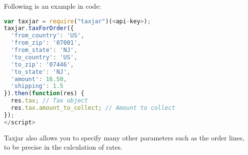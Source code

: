 Following is an example in code:
\begin{lstlisting}[language=javascript]
var taxjar = require("taxjar")(<api-key>);
taxjar.taxForOrder({
  'from_country': 'US',
  'from_zip': '07001',
  'from_state': 'NJ',
  'to_country': 'US',
  'to_zip': '07446',
  'to_state': 'NJ',
  'amount': 16.50,
  'shipping': 1.5
}).then(function(res) {
  res.tax; // Tax object
  res.tax.amount_to_collect; // Amount to collect
});
</script>
\end{lstlisting}
Taxjar also allows you to specify many other parameters such as the order lines, to be precise in the calculation of rates.